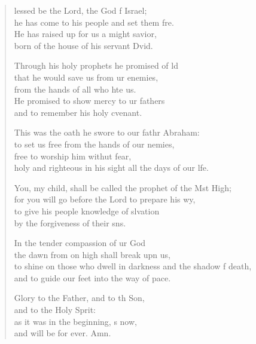 \begin{verse}
  \begin{patverse}
lessed be the Lord, the God f Israel;\Med\\
he has come to his people and set them fre.\\
He has raised up for us a might savior,\Med\\
born of the house of his servant Dvid.

Through his holy prophets he promised of ld\Flex\\
that he would save us from ur enemies,\Med\\
from the hands of all who hte us.\\
He promised to show mercy to ur fathers\Med\\
and to remember his holy cvenant.

This was the oath he swore to our fathr Abraham:\Med\\
to set us free from the hands of our nemies,\\
free to worship him withut fear,\Med\\
holy and righteous in his sight all the days of our l\pointup{\i}fe.

You, my child, shall be called the prophet of the Mst High;\Med\\
for you will go before the Lord to prepare his wy,\\
to give his people knowledge of slvation\Med\\
by the forgiveness of their s\pointup{\i}ns.

In the tender compassion of ur God\Med\\
the dawn from on high shall break upn us,\\
to shine on those who dwell in darkness and the shadow f death,\Med\\
and to guide our feet into the way of pace.

Glory to the Father, and to th Son,\Med\\
and to the Holy Sp\pointup{\i}rit:\\
as it was in the beginning, \pointup{\i}s now,\Med\\
and will be for ever. Amn.
  \end{patverse}
  \end{verse}
